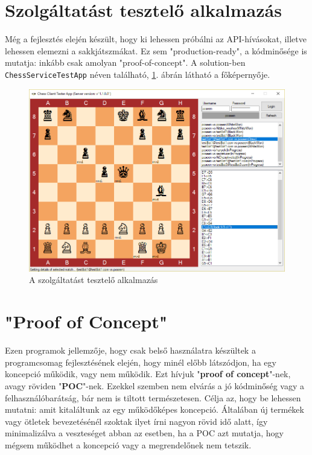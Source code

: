 \documentclass[twoside, a4paper, 12pt]{book}
\begin{document}
\section{Szolgáltatást tesztelő alkalmazás}
Még a fejlesztés elején készült, hogy ki lehessen próbálni az API-hívásokat, illetve lehessen elemezni a sakkjátszmákat. Ez sem "production-ready", a kódminősége is mutatja: inkább csak amolyan "proof-of-concept". A solution-ben \texttt{ChessServiceTestApp} néven található, \ref{fig:chessClientTesterApp}. ábrán látható a főképernyője.

\begin{figure}[htbp]
	\centering
	\includegraphics[width=1.0\textwidth]{img/chessClientTesterApp.png}
	\caption{A szolgáltatást tesztelő alkalmazás}
	\label{fig:chessClientTesterApp}
\end{figure}

\section{"Proof of Concept"}
Ezen programok jellemzője, hogy csak belső használatra készültek a programcsomag fejlesztésének elején, hogy minél előbb látszódjon, ha egy koncepció működik, vagy nem működik. Ezt hívjuk "\textbf{proof of concept}"-nek, avagy röviden "\textbf{POC}"-nek. Ezekkel szemben nem elvárás a jó kódminőség vagy a felhasználóbarátság, bár nem is tiltott természetesen. Célja az, hogy be lehessen mutatni: amit kitaláltunk az egy működőképes koncepció. Általában új termékek vagy ötletek bevezetésénél szoktak ilyet írni nagyon rövid idő alatt, így minimalizálva a veszteséget abban az esetben, ha a POC azt mutatja, hogy mégsem működhet a koncepció vagy a megrendelőnek nem tetszik.
\end{document}
